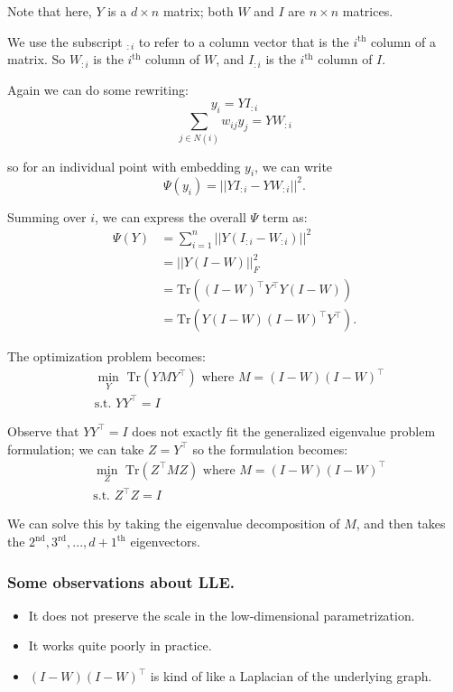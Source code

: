 Note that here, $Y$ is a $d \times n$ matrix; both $W$ and $I$ are $n \times n$ matrices.

We use the subscript $_{:i}$ to refer to a column vector that is the $i^\text{th}$ column of a matrix. So $W_{:i}$ is the $i^\text{th}$ column of $W$, and $I_{:i}$ is the $i^\text{th}$ column of $I$.

Again we can do some rewriting:
\[
y_i = Y I_{:i}
\]
\[
\sum_{j\in N(i)} w_{ij} y_j = Y W_{:i}
\]

so for an individual point with embedding $y_i$, we can write
\[
\Psi (y_i) = ||Y I_{:i} - Y W_{:i}||^2.
\]

Summing over $i$, we can express the overall $\Psi$ term as:
\begin{align*}
\Psi(Y)
&= \sum\limits_{i=1}^n ||Y(I_{:i} - W_{:i})||^2 \\
&= ||Y (I - W)||_F^2 \\
&=\text{Tr}((I-W)^\intercal Y^\intercal Y (I-W)) \\
&=\text{Tr}(Y(I-W)(I-W)^\intercal Y^\intercal).
\end{align*}

The optimization problem becomes:
\begin{align*}
&\min_Y \text{ Tr}(YMY^\intercal) \text{ where } M = (I-W)(I-W)^\intercal \\
&\text{s.t. } Y Y^\intercal=I
\end{align*}

Observe that $Y Y^\intercal=I$ does not exactly fit the generalized eigenvalue problem formulation; we can take $Z = Y^\intercal$ so the formulation becomes:
\begin{align*}
&\min_Z \text{ Tr}(Z^\intercal MZ) \text{ where } M = (I-W)(I-W)^\intercal \\
&\text{s.t. } Z^\intercal Z=I
\end{align*}

We can solve this by taking the eigenvalue decomposition of $M$, and then takes the  $2^\text{nd},3^\text{rd},...,d+1^\text{th}$ eigenvectors.

\subsubsection*{Some observations about LLE.}
\begin{itemize}
\item It does not preserve the scale in the low-dimensional parametrization.
\item It works quite poorly in practice.
\item $(I-W)(I-W)^\intercal$ is kind of like a Laplacian of the underlying graph.
\end{itemize}

